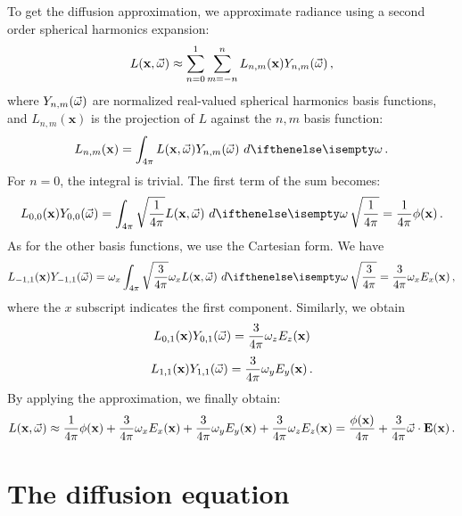 \documentclass[10pt,a4paper]{article}
\begin{document}
To get the diffusion approximation, we approximate radiance using a second order spherical harmonics expansion:
$$
{L}(\mathbf{x}, \vec{\omega}) \approx \sum_{n = 0}^{1} \sum_{m = -n}^{n} L_{n,m}(\mathbf{x}) Y_{n,m}(\vec{\omega}) \, ,
$$
where $Y_{n,m}(\vec{\omega})$ are normalized real-valued spherical harmonics basis functions,
and $L_{n,m}(\mathbf{x})$ is the projection of $L$ against the $n,m$ basis function:
$$
L_{n,m}(\mathbf{x}) = \sphere{\xomegafunc{L} Y_{n,m}(\omegavec)}{} \, .
$$
For $n = 0$, the integral is trivial.  The first term of the sum becomes:
$$
L_{0,0}(\mathbf{x}) Y_{0,0}(\omegavec) = \sphere{\sqrt{\frac{1}{4\pi}} \xomegafunc{L}}{} \, \sqrt{\frac{1}{4\pi}} = \frac{1}{4\pi} \xfunc{\phi} \, .
$$
As for the other basis functions, we use the Cartesian form. We have
$$
L_{-1,1}(\mathbf{x}) Y_{-1,1}(\omegavec) = \omega_x \sphere{\sqrt{\frac{3}{4\pi}} \omega_x \xomegafunc{L}}{} \, \sqrt{\frac{3}{4\pi}} = \frac{3}{4\pi} \omega_x {E}_x(\mathbf{x}) \, ,
$$
where the $x$ subscript indicates the first component. Similarly, we obtain
$$
L_{0,1}(\mathbf{x}) Y_{0,1}(\vec{\omega}) = \frac{3}{4\pi} \omega_z {E}_z(\mathbf{x})
$$
$$
L_{1,1}(\mathbf{x}) Y_{1,1}(\vec{\omega}) = \frac{3}{4\pi} \omega_y {E}_y(\mathbf{x}) \, .
$$
By applying the approximation, we finally obtain:
$$
{L}(\mathbf{x}, \vec{\omega}) \approx \frac{1}{4\pi} {\phi}(\mathbf{x}) + \frac{3}{4\pi} \omega_x {E}_x(\mathbf{x}) + \frac{3}{4\pi} \omega_y {E}_y(\mathbf{x})+ \frac{3}{4\pi} \omega_z {E}_z(\mathbf{x}) = \frac{{\phi}(\mathbf{x})}{4\pi} + \frac{3}{4\pi} \vec{\omega} \cdot \mathbf{E}(\mathbf{x}) \, .
$$

\section{The diffusion equation}
\end{document}
